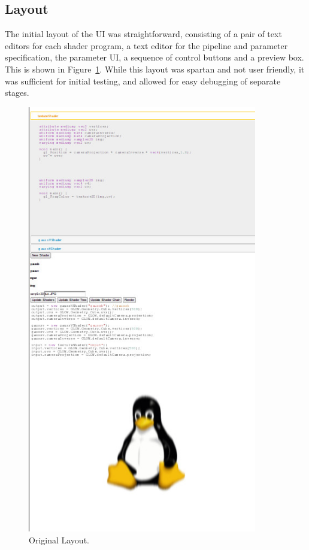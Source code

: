\documentclass[12pt,twoside,notitlepage]{report}
\begin{document}
\subsection{Layout}
The initial layout of the UI was straightforward, consisting of a pair of text editors for each shader program, a text editor for the pipeline and parameter specification, the parameter UI, a sequence of control buttons and a preview box. This is shown in Figure~\ref{bad-ui}. While this layout was spartan and not user friendly, it was sufficient for initial testing, and allowed for easy debugging of separate stages.
\begin{figure}
\centering
\includegraphics[width=100mm]{UI-before.JPG}
\caption{Original Layout.\label{bad-ui}}
\end{figure}
\end{document}
